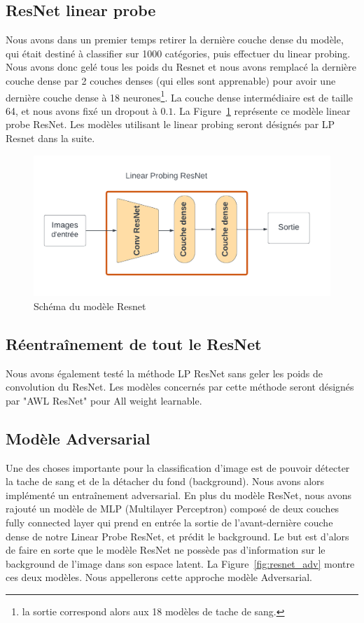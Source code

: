 \documentclass[a4paper]{article}
\begin{document}
\subsection{ResNet linear probe}
Nous avons dans un premier temps retirer la dernière couche dense du modèle, qui était destiné à classifier sur 1000 catégories, puis effectuer du linear probing. Nous avons donc gelé tous les poids du Resnet et nous avons remplacé la dernière couche dense par 2 couches denses (qui elles sont apprenable) pour avoir une dernière couche dense à 18 neurones\footnote{la sortie correspond alors aux 18 modèles de tache de sang.}. La couche dense intermédiaire est de taille 64, et nous avons fixé un dropout à $0.1$. La Figure~\ref{fig:resnet} représente ce modèle linear probe ResNet. Les modèles utilisant le linear probing seront désignés par LP Resnet dans la suite.

\begin{figure}[ht]
    \centering
    \includegraphics[width=0.7\linewidth]{../asset/Resnet.png}
    \caption{Schéma du modèle Resnet}
    \label{fig:resnet}
\end{figure}

\subsection{Réentraînement de tout le ResNet}
Nous avons également testé la méthode LP ResNet sans geler les poids de convolution du ResNet. Les modèles concernés par cette méthode seront désignés par "AWL ResNet" pour All weight learnable.

\subsection{Modèle Adversarial}

Une des choses importante pour la classification d'image est de pouvoir détecter la tache de sang et de la détacher du fond (background). Nous avons alors implémenté un entraînement adversarial. En plus du modèle ResNet, nous avons rajouté un modèle de MLP (Multilayer Perceptron) composé de deux couches fully connected layer qui prend en entrée la sortie de l'avant-dernière couche dense de notre Linear Probe ResNet, et prédit le background. Le but est d'alors de faire en sorte que le modèle ResNet ne possède pas d'information sur le background de l'image dans son espace latent. La Figure~\ref{fig:resnet_adv} montre ces deux modèles. Nous appellerons cette approche modèle Adversarial.
\end{document}

